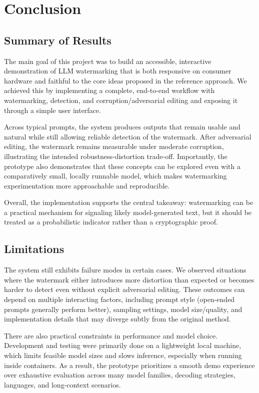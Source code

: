 \section{Conclusion}
\subsection{Summary of Results}
The main goal of this project was to build an accessible, interactive demonstration of LLM watermarking that is both responsive on consumer hardware and faithful to the core ideas proposed in the reference approach. We achieved this by implementing a complete, end-to-end workflow with watermarking, detection, and corruption/adversarial editing and exposing it through a simple user interface.

Across typical prompts, the system produces outputs that remain usable and natural while still allowing reliable detection of the watermark. After adversarial editing, the watermark remains measurable under moderate corruption, illustrating the intended robustness-distortion trade-off. Importantly, the prototype also demonstrates that these concepts can be explored even with a comparatively small, locally runnable model, which makes watermarking experimentation more approachable and reproducible.

Overall, the implementation supports the central takeaway: watermarking can be a practical mechanism for signaling likely model-generated text, but it should be treated as a probabilistic indicator rather than a cryptographic proof.

\subsection{Limitations}
The system still exhibits failure modes in certain cases. We observed situations where the watermark either introduces more distortion than expected or becomes harder to detect even without explicit adversarial editing. These outcomes can depend on multiple interacting factors, including prompt style (open-ended prompts generally perform better), sampling settings, model size/quality, and implementation details that may diverge subtly from the original method.

There are also practical constraints in performance and model choice. Development and testing were primarily done on a lightweight local machine, which limits feasible model sizes and slows inference, especially when running inside containers. As a result, the prototype prioritizes a smooth demo experience over exhaustive evaluation across many model families, decoding strategies, languages, and long-context scenarios.

